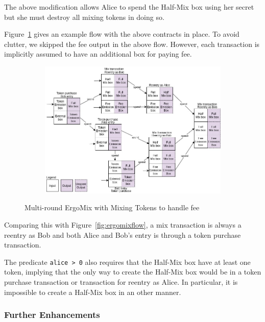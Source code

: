 \documentclass[11pt]{article}
\newcommand{\mixname}{ErgoMix\xspace}
\begin{document}
The above modification allows Alice to spend the Half-Mix box using her secret but she must destroy all mixing tokens in doing so. 

Figure~\ref{fig:mixingtokens} gives an example flow with the above contracts in place. To avoid clutter, we skipped the fee output in the above flow. However, each transaction is implicitly assumed to have an additional box for paying fee.

\begin{figure}[h]
	\centering
	\begin{subfigure}{0.9\textwidth}
		\centering
		\includegraphics[width=\linewidth]{MixingTokens.jpg}
	\end{subfigure}
	\caption{Multi-round \mixname with Mixing Tokens to handle fee}
\label{fig:mixingtokens}
\end{figure}

Comparing this with Figure~\ref{fig:ergomixflow}, a mix transaction is always a reentry as Bob and both Alice and Bob's entry is through a token purchase transaction. 

The predicate \texttt{alice > 0} also requires that the Half-Mix box have at least one token, implying that the only way to create the Half-Mix box would be in a token purchase transaction or transaction for reentry as Alice. In particular, it is impossible to create a Half-Mix box in an other manner.

\subsubsection{Further Enhancements}
\end{document}
